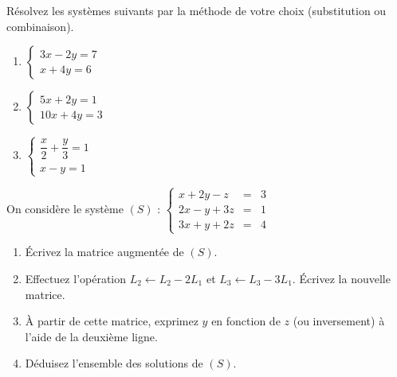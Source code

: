 \documentclass[11pt]{article}
\begin{document}
\begin{exercice}
Résolvez les systèmes suivants par la méthode de votre choix (substitution ou combinaison).
\begin{enumerate}
    \item $\left\{\begin{array}{l} 3x - 2y = 7 \\ x + 4y = 6 \end{array}\right.$
    \item $\left\{\begin{array}{l} 5x + 2y = 1 \\ 10x + 4y = 3 \end{array}\right.$
    \item $\left\{\begin{array}{l} \dfrac{x}{2} + \dfrac{y}{3} = 1 \\ x - y = 1 \end{array}\right.$
\end{enumerate}
\end{exercice}

\begin{exercice}
On considère le système $(S)$ :
$\left\{\begin{array}{rcl} x + 2y - z &=& 3 \\ 2x - y + 3z &=& 1 \\ 3x + y + 2z &=& 4 \end{array}\right.$
\begin{enumerate}
    \item Écrivez la matrice augmentée de $(S)$.
    \item Effectuez l'opération $L_2 \leftarrow L_2 - 2L_1$ et $L_3 \leftarrow L_3 - 3L_1$. Écrivez la nouvelle matrice.
    \item À partir de cette matrice, exprimez $y$ en fonction de $z$ (ou inversement) à l'aide de la deuxième ligne.
    \item Déduisez l'ensemble des solutions de $(S)$.
\end{enumerate}
\end{exercice}
\end{document}
